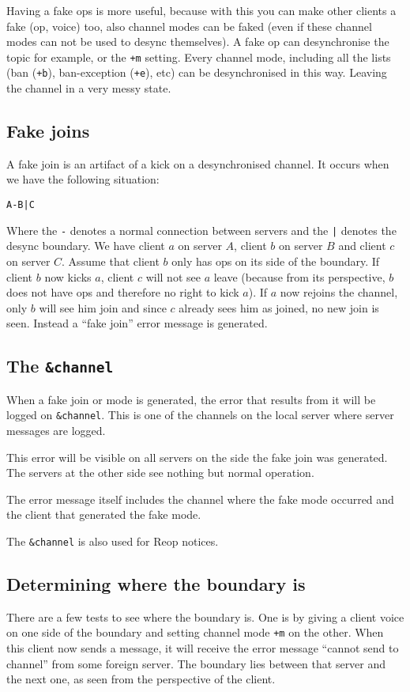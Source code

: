 \documentclass{article}
\theoremstyle{definition}
\begin{document}
Having a fake ops is more useful, because with this you can make other clients
a fake (op, voice) too, also channel modes can be faked (even if these channel
modes can not be used to desync themselves). A fake op can desynchronise the
topic for example, or the \verb#+m# setting. Every channel mode, including all
the lists (ban (\verb#+b#), ban-exception (\verb#+e#), etc) can be
desynchronised in this way. Leaving the channel in a very messy state.

\subsection{Fake joins} \label{sec:fj}
A fake join is an artifact of a kick on a desynchronised channel. It occurs
when we have the following situation:
\begin{center}
\verb#A-B|C#
\end{center}
Where the \verb#-# denotes a normal connection between servers and the \verb#|#
denotes the desync boundary. We have client $a$ on server $A$, client $b$ on
server $B$ and client $c$ on server $C$. Assume that client $b$ only has ops on
its side of the boundary. If client $b$ now kicks $a$, client $c$ will not see
$a$ leave (because from its perspective, $b$ does not have ops and therefore no
right to kick $a$). If $a$ now rejoins the channel, only $b$ will see him join
and since $c$ already sees him as joined, no new join is seen. Instead a ``fake
join'' error message is generated.

\subsection{The \tt{\&channel}} \label{sec:chan}
When a fake join or mode is generated, the error that results from it will be
logged on \verb#&channel#. This is one of the channels on the local server
where server messages are logged.

This error will be visible on all servers on the side the fake join was
generated. The servers at the other side see nothing but normal operation.

The error message itself includes the channel where the fake mode occurred and
the client that generated the fake mode.

The \verb#&channel# is also used for Reop notices.

\subsection{Determining where the boundary is} \label{sec:det}
There are a few tests to see where the boundary is. One is by giving a client
voice on one side of the boundary and setting channel mode \verb#+m# on the
other. When this client now sends a message, it will receive the error message
``cannot send to channel'' from some foreign server. The boundary lies between
that server and the next one, as seen from the perspective of the client.
\end{document}
